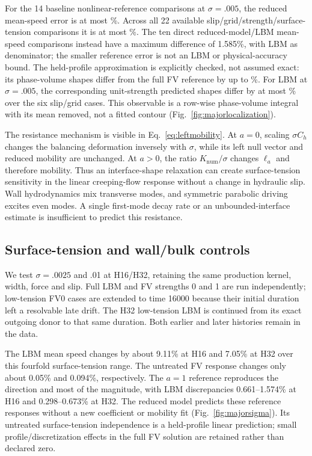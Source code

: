 For the 14 baseline nonlinear-reference comparisons at $\sigma=.005$,
the reduced mean-speed error is at most \MajorReducedBaselinePercent\%.
Across all 22 available slip/grid/strength/surface-tension comparisons it
is at most \MajorReducedAllPercent\%.
The ten direct reduced-model/LBM mean-speed comparisons instead have a
maximum difference of 1.585\%, with LBM as denominator; the smaller reference
error is not an LBM or physical-accuracy bound.
The held-profile approximation is explicitly checked, not assumed exact:
its phase-volume shapes differ from the full FV reference by up to
\MajorFVShapePercent\%.
For LBM at $\sigma=.005$, the corresponding unit-strength predicted shapes
differ by at most \MajorShapePercent\% over the six slip/grid cases.
This observable is a row-wise phase-volume integral with its mean removed,
not a fitted contour (Fig.~\ref{fig:majorlocalization}).

The resistance mechanism is visible in Eq.~\eqref{eq:leftmobility}.
At $a=0$, scaling $\sigma C_h$ changes the balancing deformation inversely
with $\sigma$, while its left null vector and reduced mobility are unchanged.
At $a>0$, the ratio $K_{\mathrm{num}}/\sigma$ changes $\ell_a$ and therefore
mobility. Thus an interface-shape relaxation can create surface-tension
sensitivity in the linear creeping-flow response without a change in
hydraulic slip. Wall hydrodynamics mix transverse modes, and symmetric
parabolic driving excites even modes. A single first-mode decay rate or
an unbounded-interface estimate is insufficient to predict this resistance.

\subsection{Surface-tension and wall/bulk controls}
We test $\sigma=.0025$ and .01 at H16/H32, retaining the same production
kernel, width, force and slip. Full LBM and FV strengths 0 and 1 are run
independently; low-tension FV0 cases are extended to time 16000 because
their initial duration left a resolvable late drift. The H32 low-tension
LBM is continued from its exact outgoing donor to that same duration.
Both earlier and later histories remain in the data.

The LBM mean speed changes by about 9.11\% at H16 and 7.05\% at H32 over
this fourfold surface-tension range. The untreated FV response changes
only about 0.05\% and 0.094\%, respectively.
The $a=1$ reference reproduces the direction and most of the magnitude,
with LBM discrepancies 0.661--1.574\% at H16 and 0.298--0.673\% at H32.
The reduced model predicts these reference responses without a new
coefficient or mobility fit (Fig.~\ref{fig:majorsigma}).
Its untreated surface-tension independence is a held-profile linear
prediction; small profile/discretization effects in the full FV solution
are retained rather than declared zero.

